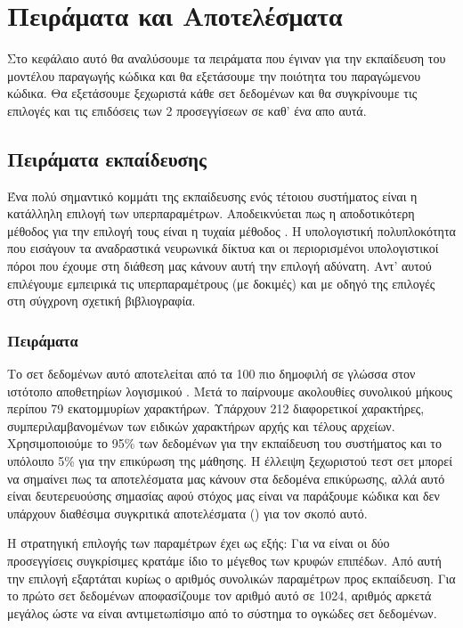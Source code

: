 \chapter{Πειράματα και Αποτελέσματα}

Στο κεφάλαιο αυτό θα αναλύσουμε τα πειράματα που έγιναν για την εκπαίδευση του μοντέλου παραγωγής κώδικα και θα εξετάσουμε την ποιότητα του παραγώμενου κώδικα.
Θα εξετάσουμε ξεχωριστά κάθε σετ δεδομένων και θα συγκρίνουμε τις επιλογές και τις επιδόσεις των 2 προσεγγίσεων σε καθ' ένα απο αυτά.

\section{Πειράματα εκπαίδευσης}

Ένα πολύ σημαντικό κομμάτι της εκπαίδευσης ενός τέτοιου συστήματος είναι η κατάλληλη επιλογή των υπερπαραμέτρων.
Αποδεικνύεται πως η αποδοτικότερη μέθοδος για την επιλογή τους είναι η τυχαία μέθοδος \cite{Bersgstra2012}.
Η υπολογιστική πολυπλοκότητα που εισάγουν τα αναδραστικά νευρωνικά δίκτυα και οι περιορισμένοι υπολογιστικοί πόροι που έχουμε στη διάθεση μας κάνουν αυτή την επιλογή αδύνατη.
Αντ' αυτού επιλέγουμε εμπειρικά τις υπερπαραμέτρους (με δοκιμές) και με οδηγό της επιλογές στη σύγχρονη σχετική βιβλιογραφία.

\subsection{ Πειράματα}

Το σετ δεδομένων αυτό αποτελείται από τα 100 πιο δημοφιλή  σε γλώσσα  στον ιστότοπο αποθετηρίων λογισμικού .
Μετά το  παίρνουμε ακολουθίες συνολικού μήκους περίπου 79 εκατομμυρίων χαρακτήρων.
Υπάρχουν 212 διαφορετικοί χαρακτήρες, συμπεριλαμβανομένων των ειδικών χαρακτήρων αρχής και τέλους αρχείων.
Χρησιμοποιούμε το 95\% των δεδομένων για την εκπαίδευση του συστήματος και το υπόλοιπο 5\% για την επικύρωση της μάθησης.
Η έλλειψη ξεχωριστού τεστ σετ μπορεί να σημαίνει πως τα αποτελέσματα μας κάνουν  στα δεδομένα επικύρωσης, αλλά αυτό είναι δευτερευούσης σημασίας αφού στόχος μας είναι να παράξουμε κώδικα και δεν υπάρχουν διαθέσιμα συγκριτικά αποτελέσματα () για τον σκοπό αυτό.

Η στρατηγική επιλογής των παραμέτρων έχει ως εξής: Για να είναι οι δύο προσεγγίσεις συγκρίσιμες κρατάμε ίδιο το μέγεθος των κρυφών επιπέδων.
Από αυτή την επιλογή εξαρτάται κυρίως ο αριθμός συνολικών παραμέτρων προς εκπαίδευση.
Για το πρώτο σετ δεδομένων αποφασίζουμε τον αριθμό αυτό σε 1024, αριθμός αρκετά μεγάλος ώστε να είναι αντιμετωπίσιμο από το σύστημα το ογκώδες σετ δεδομένων.


